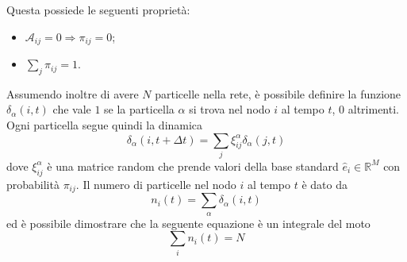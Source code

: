 \documentclass[../main.tex]{subfiles}
\begin{document}
Questa possiede le seguenti proprietà:
\begin{itemize}
    \item $\mathcal{A}_{ij}=0 \Longrightarrow \pi_{ij}=0$;
    \item $\sum_j\pi_{ij}=1$.
\end{itemize}
Assumendo inoltre di avere $N$ particelle nella rete, \`e possibile definire la funzione $\delta_\alpha(i,t)$ che vale $1$ se la particella $\alpha$ si trova nel nodo $i$ al tempo $t$, 0 altrimenti.
\\Ogni particella segue quindi la dinamica
\begin{equation*}
    \delta_\alpha(i,t+\Delta t)=\sum_j\xi_{ij}^\alpha\delta_\alpha(j,t)
\end{equation*}
dove $\xi_{ij}^\alpha$ \`e una matrice random che prende valori della base standard $\widehat{e}_i\in \mathbb{R}^M$ con probabilità $\pi_{ij}$.
Il numero di particelle nel nodo $i$ al tempo $t$ \`e dato da
\begin{equation*}
    n_i(t)=\sum_\alpha\delta_\alpha(i,t)
\end{equation*}
ed \`e possibile dimostrare \cite{RandomWalks} che la seguente equazione \`e un integrale del moto
\begin{equation}
    \sum_in_i(t)=N
\end{equation}
\end{document}

